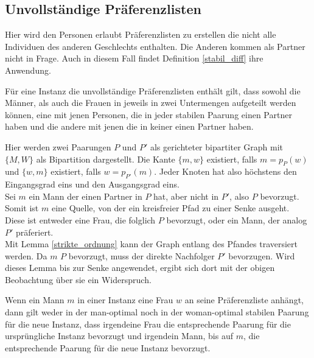 \subsection{Unvollständige Präferenzlisten}

Hier wird den Personen erlaubt Präferenzlisten zu erstellen die nicht alle Individuen des anderen Geschlechts enthalten. Die Anderen kommen als Partner nicht in Frage. Auch in diesem Fall findet Definition \ref{stabil_diff} ihre Anwendung.

\begin{Theorem}
\label{partner_oder_nicht}
  Für eine Instanz die unvollständige Präferenzlisten enthält gilt, dass sowohl die Männer, als auch die Frauen in jeweils in zwei Untermengen aufgeteilt werden können, eine mit jenen Personen, die in jeder stabilen Paarung einen Partner haben und die andere mit jenen die in keiner einen Partner haben.
\end{Theorem}

\begin{Beweis}
\label{partner_oder_nicht_bew}
  Hier werden zwei Paarungen $P$ und $P'$ als gerichteter bipartiter Graph mit $\{M,W\}$ als Bipartition dargestellt. Die Kante $\{m,w\}$ existiert, falls $m = p_{P}(w)$ und $\{w,m\}$ existiert, falls $w = p_{P'}(m)$. Jeder Knoten hat also höchstens den Eingangsgrad eins und den Ausgangsgrad eins.\\
  Sei $m$ ein Mann der einen Partner in $P$ hat, aber nicht in $P'$, also $P$ bevorzugt. Somit ist $m$ eine Quelle, von der ein kreisfreier Pfad zu einer Senke ausgeht. Diese ist entweder eine Frau, die folglich $P$ bevorzugt, oder ein Mann, der analog $P'$ präferiert.\\
  Mit Lemma \ref{strikte_ordnung} kann der Graph entlang des Pfandes traversiert werden. Da $m$ $P$ bevorzugt, muss der direkte Nachfolger $P'$ bevorzugen. Wird dieses Lemma bis zur Senke angewendet, ergibt sich dort mit der obigen Beobachtung über sie ein Widerspruch.
\end{Beweis}


\begin{Theorem}
\label{element_enfuegen}
  Wenn ein Mann $m$ in einer Instanz eine Frau $w$ an seine Prä\-fe\-renz\-lis\-te anhängt, dann gilt weder in der man-optimal noch in der woman-optimal stabilen Paarung für die neue Instanz, dass irgendeine Frau die entsprechende Paarung für die ursprüngliche Instanz bevorzugt und irgendein Mann, bis auf $m$, die entsprechende Paarung für die neue Instanz bevorzugt.
\end{Theorem}

